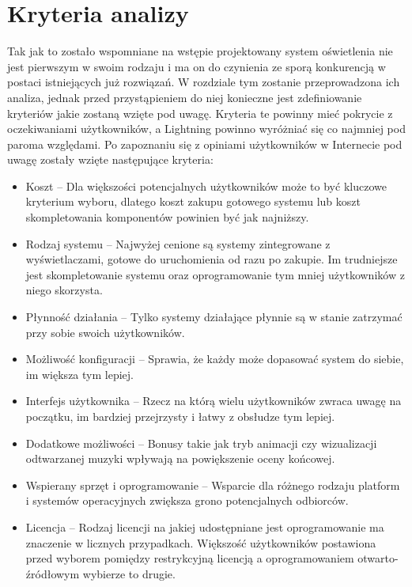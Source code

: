 \documentclass[12pt]{report}
\begin{document}
\section{Kryteria analizy} \label{kryt}

Tak jak to zostało wspomniane na wstępie projektowany system oświetlenia nie jest pierwszym w swoim rodzaju i ma on do czynienia ze sporą konkurencją w postaci istniejących już rozwiązań. W rozdziale tym zostanie przeprowadzona ich analiza, jednak przed przystąpieniem do niej konieczne jest zdefiniowanie kryteriów jakie zostaną wzięte pod uwagę. Kryteria te powinny mieć pokrycie z oczekiwaniami użytkowników, a Lightning powinno wyróżniać się co najmniej pod paroma względami. Po zapoznaniu się z opiniami użytkowników w Internecie pod uwagę zostały wzięte następujące kryteria:

\begin{itemize}
	\item Koszt -- Dla większości potencjalnych użytkowników może to być kluczowe kryterium wyboru, dlatego koszt zakupu gotowego systemu lub koszt skompletowania komponentów powinien być jak najniższy.
	\item Rodzaj systemu -- Najwyżej cenione są systemy zintegrowane z wyświetlaczami, gotowe do uruchomienia od razu po zakupie. Im trudniejsze jest skompletowanie systemu oraz oprogramowanie tym mniej użytkowników z niego skorzysta.
	\item Płynność działania -- Tylko systemy działające płynnie są w stanie zatrzymać przy sobie swoich użytkowników.
	\item Możliwość konfiguracji -- Sprawia, że każdy może dopasować system do siebie, im większa tym lepiej.
	\item Interfejs użytkownika -- Rzecz na którą wielu użytkowników zwraca uwagę na początku, im bardziej przejrzysty i łatwy z obsłudze tym lepiej.
	\item Dodatkowe możliwości -- Bonusy takie jak tryb animacji czy wizualizacji odtwarzanej muzyki wpływają na powiększenie oceny końcowej.
	\item Wspierany sprzęt i oprogramowanie -- Wsparcie dla różnego rodzaju platform i systemów operacyjnych zwiększa grono potencjalnych odbiorców.
	\item Licencja -- Rodzaj licencji na jakiej udostępniane jest oprogramowanie ma znaczenie w licznych przypadkach. Większość użytkowników postawiona przed wyborem pomiędzy restrykcyjną licencją a oprogramowaniem otwarto-źródłowym wybierze to drugie.
\end{itemize} 
\end{document}
